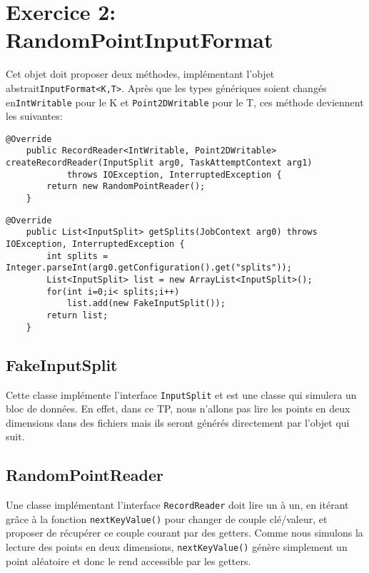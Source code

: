 \documentclass[a4paper]{article}
\begin{document}
\section{Exercice 2: RandomPointInputFormat}
Cet objet doit proposer deux méthodes, implémentant l'objet abstrait\newline  \verb?InputFormat<K,T>?. Après que les types génériques soient changés en\newline  \verb?IntWritable? pour le K et \verb?Point2DWritable? pour le T, ces méthode deviennent les suivantes:
\begin{lstlisting}
@Override
	public RecordReader<IntWritable, Point2DWritable> createRecordReader(InputSplit arg0, TaskAttemptContext arg1)
			throws IOException, InterruptedException {
		return new RandomPointReader();
	}
\end{lstlisting}

\begin{lstlisting}
@Override
	public List<InputSplit> getSplits(JobContext arg0) throws IOException, InterruptedException {
        int splits = Integer.parseInt(arg0.getConfiguration().get("splits"));
		List<InputSplit> list = new ArrayList<InputSplit>();
		for(int i=0;i< splits;i++)
			list.add(new FakeInputSplit());
		return list;
	}
\end{lstlisting}

\subsection{FakeInputSplit}
Cette classe implémente l'interface \verb?InputSplit? et est une classe qui simulera un bloc de données. En effet, dans ce TP, nous n'allons pas lire les points en deux dimensions dans des fichiers mais ils seront générés directement par l'objet qui suit.

\subsection{RandomPointReader}
Une classe implémentant l'interface \verb?RecordReader? doit lire un à un, en itérant grâce à la fonction \verb?nextKeyValue()? pour changer de couple clé/valeur, et proposer de récupérer ce couple courant par des getters.
Comme nous simulons la lecture des points en deux dimensions, \verb?nextKeyValue()? génère simplement un point aléatoire et donc le rend accessible par les getters.
\end{document}
